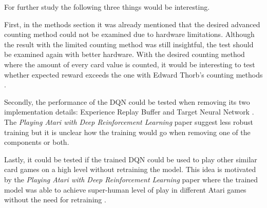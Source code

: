 \documentclass[conference]{IEEEtran}
\begin{document}
For further study the following three things would be interesting. 

First, in the methods section it was already mentioned that the desired advanced counting method could not be examined due to hardware limitations. 
Although the result with the limited counting method was still insightful, the test should be examined again with better hardware.
With the desired counting method where the amount of every card value is counted, it would be interesting to test whether expected reward exceeds the one with Edward Thorb's counting methods \cite{b1}.

Secondly, the performance of the DQN could be tested when removing its two implementation details: Experience Replay Buffer and Target Neural Network \cite{b2}.
The \textit{Playing Atari with Deep Reinforcement Learning} paper \cite{b2} suggest less robust training but it is unclear how the training would go when removing one of the components or both. 

Lastly, it could be tested if the trained DQN could be used to play other similar card games on a high level without retraining the model. 
This idea is motivated by the \textit{Playing Atari with Deep Reinforcement Learning} paper where the trained model was able to achieve super-human level of play in different Atari games without the need for retraining \cite{b2}. 





\end{document}
